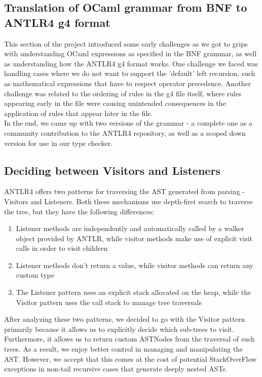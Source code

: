 \subsection{Translation of OCaml grammar from BNF to ANTLR4 g4 format}
This section of the project introduced some early challenges as we got to grips with understanding OCaml expressions as specified in the BNF grammar, as well as understanding how the ANTLR4 g4 format works. One challenge we faced was handling cases where we do not want to support the 'default' left recursion, such as mathematical expressions that have to respect operator precedence. Another challenge was related to the ordering of rules in the g4 file itself, where rules appearing early in the file were causing unintended consequences in the application of rules that appear later in the file. \\

In the end, we came up with two versions of the grammar - a complete one as a community contribution to the ANTLR4 repository, as well as a scoped down version for use in our type checker.
  
\subsection{Deciding between Visitors and Listeners}
ANTLR4 offers two patterns for traversing the AST generated from parsing - Visitors and Listeners. Both these mechanisms use depth-first search to traverse the tree, but they have the following differences: 
\begin{enumerate}
    \item Listener methods are independently and automatically called by a walker object provided by ANTLR, while visitor methods make use of explicit visit calls in order to visit children
    \item Listener methods don't return a value, while visitor methods can return any custom type
    \item The Listener pattern uses an explicit stack allocated on the heap, while the Visitor pattern uses the call stack to manage tree traversals
\end{enumerate}
 After analyzing these two patterns, we decided to go with the Visitor pattern primarily because it allows us to explicitly decide which sub-trees to visit. Furthermore, it allows us to return custom ASTNodes from the traversal of such trees. As a result, we enjoy better control in managing and manipulating the AST. However, we accept that this comes at the cost of potential StackOverFlow exceptions in non-tail recursive cases that generate deeply nested ASTs.
 
